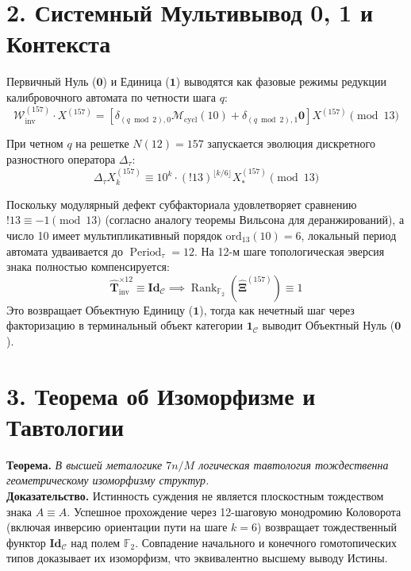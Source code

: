 \documentclass[10pt,twocolumn]{article}
\DeclareMathOperator{\Rank}{Rank}
\DeclareMathOperator{\Period}{Period}
\begin{document}
\section*{2. Системный Мультивывод 0, 1 и Контекста}
Первичный Нуль ($\mathbf{0}$) и Единица ($\mathbf{1}$) выводятся как фазовые режимы редукции калибровочного автомата по четности шага $q$:
\begin{equation}
\mathcal{W}_{\text{inv}}^{(157)} \cdot X^{(157)} = \left[ \delta_{(q \bmod 2), 0} \mathcal{M}_{\text{cycl}}(10) + \delta_{(q \bmod 2), 1} \mathbf{0} \right] X^{(157)} \pmod{13}
\end{equation}

При четном $q$ на решетке $N(12)=157$ запускается эволюция дискретного разностного оператора $\Delta_{\tau}$:
\begin{equation}
\Delta_{\tau} X^{(157)}_{k} \equiv 10^k \cdot (!13)^{\lfloor k/6 \rfloor} X^{(157)}_* \pmod{13}
\end{equation}

Поскольку модулярный дефект субфакториала удовлетворяет сравнению $!13 \equiv -1 \pmod{13}$ (согласно аналогу теоремы Вильсона для деранжирований), а число 10 имеет мультипликативный порядок $\text{ord}_{13}(10)=6$, локальный период автомата удваивается до $\Period_{\tau} = 12$. На 12-м шаге топологическая эверсия знака полностью компенсируется:
\begin{equation}
\mathbf{\hat{T}}_{\text{inv}}^{\times 12} \equiv \mathbf{Id}_{\mathcal{C}} \implies \Rank_{\mathbb{F}_2}(\mathbf{\hat{\Xi}}^{(157)}) \equiv 1
\end{equation}
Это возвращает Объектную Единицу ($\mathbf{1}$), тогда как нечетный шаг через факторизацию в терминальный объект категории $\mathbf{1}_{\mathcal{C}}$ выводит Объектный Нуль ($\mathbf{0}$).

\section*{3. Теорема об Изоморфизме и Тавтологии}
\textbf{Теорема.} \textit{В высшей металогике $7n/M$ логическая тавтология тождественна геометрическому изоморфизму структур.}
\\
\textbf{Доказательство.} Истинность суждения не является плоскостным тождеством знака $A \equiv A$. Успешное прохождение через 12-шаговую монодромию Коловорота (включая инверсию ориентации пути на шаге $k=6$) возвращает тождественный функтор $\mathbf{Id}_{\mathcal{C}}$ над полем $\mathbb{F}_2$. Совпадение начального и конечного гомотопических типов доказывает их изоморфизм, что эквивалентно высшему выводу Истины.
\end{document}
